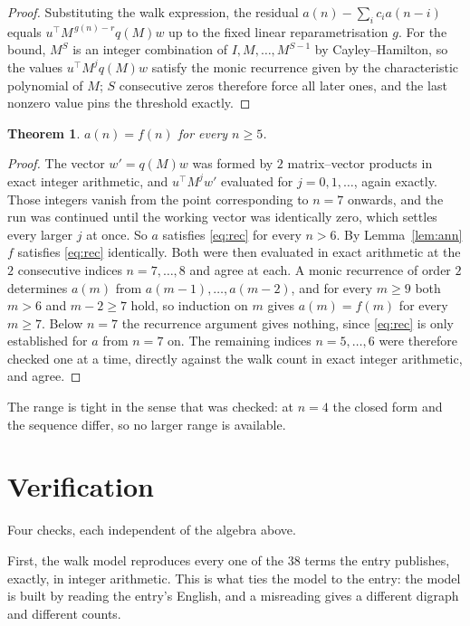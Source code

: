 \documentclass[11pt,a4paper]{article}
\theoremstyle{plain}
\newtheorem{theorem}{Theorem}
\theoremstyle{definition}
\begin{document}
\begin{proof}
Substituting the walk expression, the residual $a(n)-\sum_ic_ia(n-i)$ equals
$u^{\!\top}M^{\,g(n)-r}q(M)w$ up to the fixed linear reparametrisation $g$. For the bound,
$M^{S}$ is an integer combination of $I,M,\dots,M^{S-1}$ by Cayley--Hamilton, so the values
$u^{\!\top}M^{j}q(M)w$ satisfy the monic recurrence given by the characteristic polynomial of
$M$; $S$ consecutive zeros therefore force all later ones, and the last nonzero value pins the
threshold exactly.
\end{proof}

\begin{theorem}
$a(n)=f(n)$ for every $n\ge5$.
\end{theorem}

\begin{proof}
The vector $w'=q(M)w$ was formed by $2$ matrix--vector products in exact integer
arithmetic, and $u^{\!\top}M^{j}w'$ evaluated for $j=0,1,\dots$, again exactly. Those integers
vanish from the point corresponding to $n=7$ onwards, and the run was continued until the
working vector was identically zero, which settles every larger $j$ at once. So $a$ satisfies
\eqref{eq:rec} for every $n>6$. By Lemma~\ref{lem:ann} $f$ satisfies \eqref{eq:rec}
identically. Both were then evaluated in exact arithmetic at the $2$ consecutive indices
$n=7,\dots,8$ and agree at each. A monic recurrence of order $2$
determines $a(m)$ from $a(m-1),\dots,a(m-2)$, and for every $m\ge9$ both
$m>6$ and $m-2\ge7$ hold, so induction on $m$ gives $a(m)=f(m)$ for every
$m\ge7$.
Below $n=7$ the recurrence argument gives nothing, since \eqref{eq:rec} is only
established for $a$ from $n=7$ on. The remaining indices $n=5,\dots,6$ were
therefore checked one at a time, directly against the walk count in exact integer arithmetic,
and agree.
\end{proof}

The range is tight in the sense that was checked: at $n=4$ the closed form and the sequence differ, so no larger range is available.

\section{Verification}

Four checks, each independent of the algebra above.

First, the walk model reproduces every one of the $38$ terms the entry publishes,
exactly, in integer arithmetic. This is what ties the model to the entry: the model is built
by reading the entry's English, and a misreading gives a different digraph and different
counts.
\end{document}
